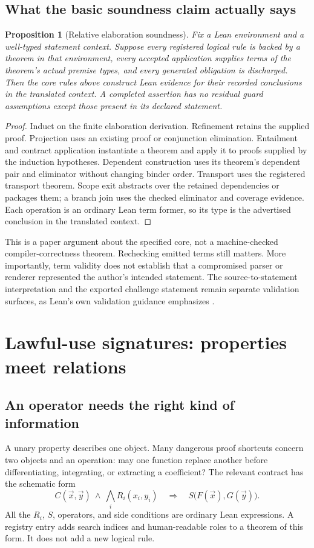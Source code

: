 \documentclass[11pt,a4paper]{article}
\theoremstyle{plain}\newtheorem{proposition}{Proposition}[section]
\theoremstyle{definition}\newtheorem{definition}[proposition]{Definition}
\theoremstyle{remark}\newtheorem{remark}[proposition]{Remark}
\begin{document}
\subsection{What the basic soundness claim actually says}
\begin{proposition}[Relative elaboration soundness]\label{prop:elab}
Fix a Lean environment and a well-typed statement context. Suppose every registered logical rule is backed by a theorem in that environment, every accepted application supplies terms of the theorem's actual premise types, and every generated obligation is discharged. Then the core rules above construct Lean evidence for their recorded conclusions in the translated context. A completed assertion has no residual guard assumptions except those present in its declared statement.
\end{proposition}
\begin{proof}
Induct on the finite elaboration derivation. Refinement retains the supplied proof. Projection uses an existing proof or conjunction elimination. Entailment and contract application instantiate a theorem and apply it to proofs supplied by the induction hypotheses. Dependent construction uses its theorem's dependent pair and eliminator without changing binder order. Transport uses the registered transport theorem. Scope exit abstracts over the retained dependencies or packages them; a branch join uses the checked eliminator and coverage evidence. Each operation is an ordinary Lean term former, so its type is the advertised conclusion in the translated context.
\end{proof}

This is a paper argument about the specified core, not a machine-checked compiler-correctness theorem. Rechecking emitted terms still matters. More importantly, term validity does not establish that a compromised parser or renderer represented the author's intended statement. The source-to-statement interpretation and the exported challenge statement remain separate validation surfaces, as Lean's own validation guidance emphasizes \cite{validation}.

\section{Lawful-use signatures: properties meet relations}\label{sec:relations}
\subsection{An operator needs the right kind of information}
A unary property describes one object. Many dangerous proof shortcuts concern two objects and an operation: may one function replace another before differentiating, integrating, or extracting a coefficient? The relevant contract has the schematic form
\[
 C(\vec x,\vec y)\ \land\ \bigwedge_i R_i(x_i,y_i)
 \quad\Longrightarrow\quad
 S\bigl(F(\vec x),G(\vec y)\bigr).
\]
All the \(R_i\), \(S\), operators, and side conditions are ordinary Lean expressions. A registry entry adds search indices and human-readable roles to a theorem of this form. It does not add a new logical rule.
\end{document}
